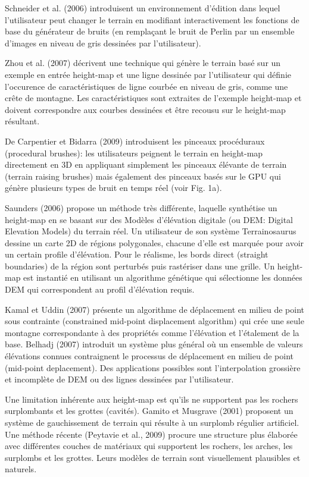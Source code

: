 \documentclass[11pt]{report}
\begin{document}
Schneider et al. (2006) introduisent un environnement d'édition dans lequel l'utilisateur peut changer le terrain en modifiant interactivement les fonctions de base du générateur de bruits (en remplaçant le bruit de Perlin par un ensemble d'images en niveau de gris dessinées par l'utilisateur). 

Zhou et al. (2007) décrivent une technique qui génère le terrain basé sur un exemple en entrée height-map et une ligne dessinée par l'utilisateur qui définie l'occurence de caractéristiques de ligne courbée en niveau de gris, comme une crête de montagne. Les caractéristiques sont extraites de l'exemple height-map et doivent correspondre aux courbes dessinées et être recousu sur le height-map résultant. 

De Carpentier et Bidarra (2009) introduisent les pinceaux procéduraux (procedural brushes): les utilisateurs peignent le terrain en height-map directement en 3D en appliquant simplement les pinceaux élévante de terrain (terrain raising brushes) mais également des pinceaux basés sur le GPU qui génère plusieurs types de bruit en temps réel (voir Fig. 1a). 

Saunders (2006) propose un méthode très différente, laquelle synthétise un height-map en se basant sur des Modèles d'élévation  digitale (ou DEM: Digital Elevation Models) du terrain réel. Un utilisateur de son système Terrainosaurus dessine un carte 2D de régions polygonales, chacune d'elle est marquée pour avoir un certain profile d'élévation. Pour le réalisme, les bords direct (straight boundaries) de la région sont perturbés puis rastériser dans une grille. Un height-map est instantié en utilisant un algorithme génétique qui sélectionne les données DEM qui correspondent au profil d'élévation requis. 

Kamal et Uddin (2007) présente un algorithme de déplacement en milieu de point sous contrainte (constrained mid-point displacement algorithm) qui crée une seule montagne correspondante à des propriétés comme l'élévation et l'étalement de la base. Belhadj (2007) introduit un système plus général où un ensemble de valeurs élévations connues contraignent le processus de déplacement en milieu de point (mid-point deplacement). Des applications possibles sont l'interpolation grossière et incomplète de DEM ou des lignes dessinées par l'utilisateur. \newline

Une limitation inhérente aux height-map est qu'ils ne supportent pas les rochers surplombants et les grottes (cavités). Gamito et Musgrave (2001) proposent un système de gauchissement de terrain qui résulte à un surplomb régulier artificiel. Une méthode récente (Peytavie et al., 2009) procure une structure plus élaborée avec différentes couches de matériaux qui supportent les rochers, les arches, les surplombs et les grottes. Leurs modèles de terrain sont visuellement plausibles et naturels.\newline
\end{document}

